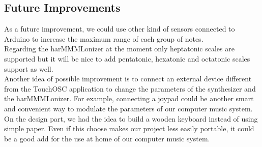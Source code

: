 \documentclass{article}
\begin{document}
\subsection{Future Improvements}

As a future improvement, we could use other kind of sensors connected to Arduino to increase the maximum range of each group of notes.
\\ Regarding the harMMMLonizer at the moment only heptatonic scales are supported but it will be nice to add pentatonic, hexatonic and octatonic scales support as well.
\\Another idea of possible improvement is to connect an external device different from the TouchOSC application to change the parameters of the synthesizer and the harMMMLonizer. For example, connecting a joypad could be another smart and convenient way to modulate the parameters of our computer music system.
\\On the design part, we had the idea to build a wooden keyboard instead of using simple paper. Even if this choose makes our project less easily portable, it could be a good add for the use at home of our computer music system.
\end{document}
